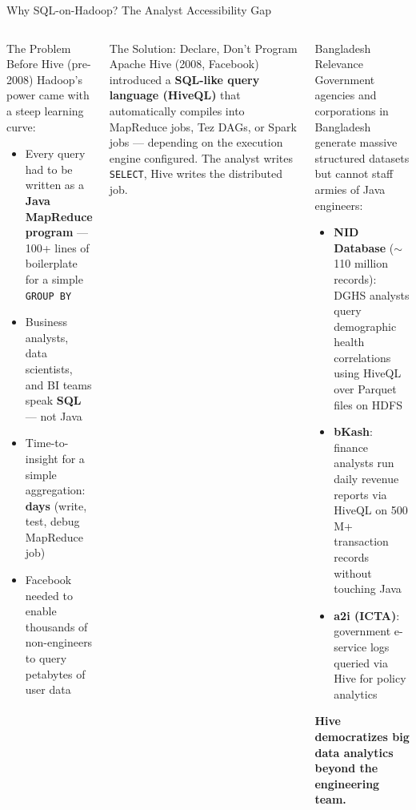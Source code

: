 \documentclass[aspectratio=169,10pt]{beamer}
\begin{document}
\begin{frame}{Why SQL-on-Hadoop? The Analyst Accessibility Gap}
  \begin{columns}[T]
      \begin{block}{The Problem Before Hive (pre-2008)}
        Hadoop's power came with a steep learning curve:
        \begin{itemize}
          \item Every query had to be written as a \textbf{Java MapReduce program} — 100+ lines of boilerplate for a simple \texttt{GROUP BY}
          \item Business analysts, data scientists, and BI teams speak \textbf{SQL} — not Java
          \item Time-to-insight for a simple aggregation: \textbf{days} (write, test, debug MapReduce job)
          \item Facebook needed to enable thousands of non-engineers to query petabytes of user data
        \end{itemize}
      \end{block}
      \vspace{4pt}
      \begin{exampleblock}{The Solution: Declare, Don't Program}
        \small Apache Hive (2008, Facebook) introduced a \textbf{SQL-like query language (HiveQL)} that automatically compiles into MapReduce jobs, Tez DAGs, or Spark jobs — depending on the execution engine configured.  The analyst writes \texttt{SELECT}, Hive writes the distributed job.
      \end{exampleblock}

      \begin{alertblock}{Bangladesh Relevance}
        \small Government agencies and corporations in Bangladesh generate massive structured datasets but cannot staff armies of Java engineers:
        \begin{itemize}
          \item \textbf{NID Database} ($\sim$110 million records): DGHS analysts query demographic health correlations using HiveQL over Parquet files on HDFS
          \item \textbf{bKash}: finance analysts run daily revenue reports via HiveQL on 500 M+ transaction records without touching Java
          \item \textbf{a2i (ICTA)}: government e-service logs queried via Hive for policy analytics
        \end{itemize}
        \textbf{Hive democratizes big data analytics beyond the engineering team.}
      \end{alertblock}
  \end{columns}
\end{frame}
\end{document}
